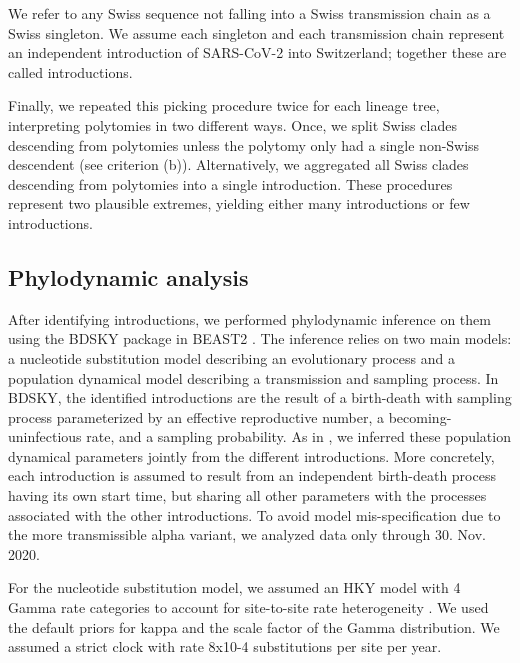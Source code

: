 \documentclass[9pt,twoside,lineno]{pnas-new} %
\begin{document}
We refer to any Swiss sequence not falling into a Swiss transmission chain as a Swiss singleton. We assume each singleton and each transmission chain represent an independent introduction of SARS-CoV-2 into Switzerland; together these are called introductions.

Finally, we repeated this picking procedure twice for each lineage tree, interpreting polytomies in two different ways. Once, we split Swiss clades descending from polytomies unless the polytomy only had a single non-Swiss descendent (see criterion (b)). Alternatively, we aggregated all Swiss clades descending from polytomies into a single introduction. These procedures represent two plausible extremes, yielding either many introductions or few introductions.

\subsection*{Phylodynamic analysis}

After identifying introductions, we performed phylodynamic inference on them using the BDSKY package \cite{stadler2013birth} in BEAST2 \cite{Bouckaert2019}. The inference relies on two main models: a nucleotide substitution model describing an evolutionary process and a population dynamical model describing a transmission and sampling process. In BDSKY, the identified introductions are the result of a birth-death with sampling process parameterized by an effective reproductive number, a becoming-uninfectious rate, and a sampling probability. As in \cite{Muller2020}, we inferred these population dynamical parameters jointly from the different introductions. More concretely, each introduction is assumed to result from an independent birth-death process having its own start time, but sharing all other parameters with the processes associated with the other introductions. To avoid model mis-specification due to the more transmissible alpha variant, we analyzed data only through 30. Nov. 2020. 

For the nucleotide substitution model, we assumed an HKY \cite{Hasegawa1985} model with 4 Gamma rate categories to account for site-to-site rate heterogeneity \cite{Yang1994}. We used the default priors for kappa and the scale factor of the Gamma distribution. We assumed a strict clock with rate 8x10-4 substitutions per site per year. 
\end{document}
